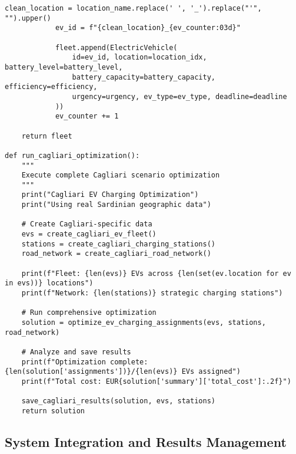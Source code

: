 \documentclass[12pt,a4paper]{article}
\begin{document}
\begin{lstlisting}[caption=Real-World Data Integration System,label=lst:cagliari]
            clean_location = location_name.replace(' ', '_').replace("'", "").upper()
            ev_id = f"{clean_location}_{ev_counter:03d}"
            
            fleet.append(ElectricVehicle(
                id=ev_id, location=location_idx, battery_level=battery_level,
                battery_capacity=battery_capacity, efficiency=efficiency,
                urgency=urgency, ev_type=ev_type, deadline=deadline
            ))
            ev_counter += 1
    
    return fleet

def run_cagliari_optimization():
    """
    Execute complete Cagliari scenario optimization
    """
    print("Cagliari EV Charging Optimization")
    print("Using real Sardinian geographic data")
    
    # Create Cagliari-specific data
    evs = create_cagliari_ev_fleet()
    stations = create_cagliari_charging_stations()
    road_network = create_cagliari_road_network()
    
    print(f"Fleet: {len(evs)} EVs across {len(set(ev.location for ev in evs))} locations")
    print(f"Network: {len(stations)} strategic charging stations")
    
    # Run comprehensive optimization
    solution = optimize_ev_charging_assignments(evs, stations, road_network)
    
    # Analyze and save results
    print(f"Optimization complete: {len(solution['assignments'])}/{len(evs)} EVs assigned")
    print(f"Total cost: EUR{solution['summary']['total_cost']:.2f}")
    
    save_cagliari_results(solution, evs, stations)
    return solution
\end{lstlisting}

\subsection{System Integration and Results Management}
\end{document}
